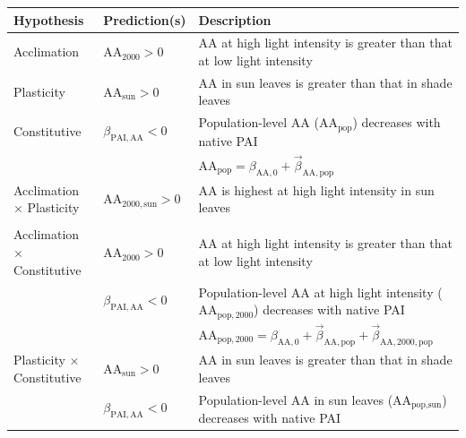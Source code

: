 \documentclass[
  letterpaper,
  DIV=11,
  numbers=noendperiod]{scrartcl}
\newcommand{\aax}{$\mathrm{AA}$}
\begin{document}
\begin{longtable}{>{\raggedright\arraybackslash}p{1in}>{\raggedright\arraybackslash}p{1.5in}>{\raggedright\arraybackslash}p{3in}}
\toprule
\textbf{Hypothesis} & \textbf{Prediction(s)} & \textbf{Description}\\
\midrule
Acclimation & $\mathrm{AA}_{2000} > 0$ & \hspace{-1em}\aax{} at high light intensity is greater than that at low light intensity\\
\cmidrule{1-3}\pagebreak[0]
Plasticity & $\mathrm{AA}_{\text{sun}} > 0$ & \hspace{-1em}\aax{} in sun leaves is greater than that in shade leaves\\
\cmidrule{1-3}\pagebreak[0]
Constitutive & $\beta_{\mathrm{PAI,AA}} < 0$ & \hspace{-1em}Population-level \aax{} ($\mathrm{AA}_\text{pop}$) decreases with native PAI\\
\nopagebreak
 &  & \hspace{-1em}$\mathrm{AA}_\text{pop} = \beta_{\mathrm{AA}, 0} + \vec{\beta}_{\mathrm{AA}, \text{pop}}$\\
\cmidrule{1-3}\pagebreak[0]
Acclimation $\times$ Plasticity & $\mathrm{AA}_{2000,\text{sun}} > 0$ & \hspace{-1em}\aax{} is highest at high light intensity in sun leaves\\
\nopagebreak
 &  & \hspace{-1em}\\
\cmidrule{1-3}\pagebreak[0]
Acclimation $\times$ Constitutive & $\mathrm{AA}_{2000} > 0$ & \hspace{-1em}\aax{} at high light intensity is greater than that at low light intensity\\
\nopagebreak
 & $\beta_{\mathrm{PAI,AA}} < 0$ & \hspace{-1em}Population-level \aax{} at high light intensity ($\mathrm{AA}_{\text{pop},2000}$) decreases with native PAI\\
\nopagebreak
 &  & \hspace{-1em}$\mathrm{AA}_{\text{pop},2000} = \beta_{\mathrm{AA}, 0} + \vec{\beta}_{\mathrm{AA}, \text{pop}} + \vec{\beta}_{\mathrm{AA}, 2000, \text{pop}}$\\
\cmidrule{1-3}\pagebreak[0]
Plasticity $\times$ Constitutive & $\mathrm{AA}_{\text{sun}} > 0$ & \hspace{-1em}\aax{} in sun leaves is greater than that in shade leaves\\
\nopagebreak
 & $\beta_{\mathrm{PAI,AA}} < 0$ & \hspace{-1em}Population-level \aax{} in sun leaves ($\mathrm{AA}_{\text{pop},\text{sun}}$) decreases with native PAI\\

\end{longtable}
\end{document}
